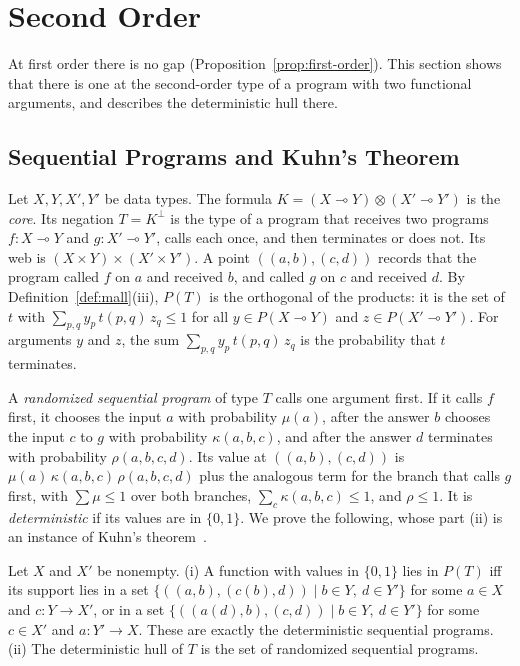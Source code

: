 \section{Second Order}
\label{sec:second}

At first order there is no gap (Proposition~\ref{prop:first-order}). This
section shows that there is one at the second-order type of a program with
two functional arguments, and describes the deterministic hull there.

\subsection{Sequential Programs and Kuhn's Theorem}
\label{sec:second-seq}

Let $X, Y, X', Y'$ be data types. The formula
$K = (X \multimap Y) \otimes (X' \multimap Y')$ is the \emph{core}. Its negation $T = K^{\perp}$ is the type of a program that receives two programs
$f : X \multimap Y$ and $g : X' \multimap Y'$, calls each once, and then
terminates or does not. Its web is $(X \times Y) \times (X' \times Y')$. A point $((a, b), (c, d))$ records that the program called $f$ on
$a$ and received $b$, and called $g$ on $c$ and received $d$. By
Definition~\ref{def:mall}(iii), $P(T)$ is the orthogonal of the products: it
is the set of $t$ with $\sum_{p, q} y_p\, t(p, q)\, z_q \le 1$ for all
$y \in P(X \multimap Y)$ and $z \in P(X' \multimap Y')$. For
arguments $y$ and $z$, the sum $\sum_{p,q} y_p\, t(p,q)\, z_q$ is the
probability that $t$ terminates.

A \emph{randomized sequential program} of type $T$ calls one argument
first. If it calls $f$ first, it chooses the input $a$ with probability
$\mu(a)$, after the answer $b$ chooses the input $c$ to $g$ with
probability $\kappa(a, b, c)$, and after the answer $d$ terminates with
probability $\rho(a, b, c, d)$. Its value at $((a, b), (c, d))$ is
$\mu(a)\, \kappa(a, b, c)\, \rho(a, b, c, d)$ plus the analogous term for
the branch that calls $g$ first, with $\sum \mu \le 1$ over both branches,
$\sum_c \kappa(a, b, c) \le 1$, and $\rho \le 1$. It is
\emph{deterministic} if its values are in $\{0,1\}$. We prove the
following, whose part (ii) is an instance of Kuhn's
theorem~\cite{kuhn1953}.

\begin{theorem}
\label{thm:second-order}
Let $X$ and $X'$ be nonempty.
(i) A function with values in $\{0,1\}$ lies in $P(T)$ iff its support
lies in a set $\{((a, b), (c(b), d)) \mid b \in Y,\ d \in Y'\}$ for some
$a \in X$ and $c : Y \to X'$, or in a set
$\{((a(d), b), (c, d)) \mid b \in Y,\ d \in Y'\}$ for some $c \in X'$ and
$a : Y' \to X$. These are exactly the deterministic sequential programs.
(ii) The deterministic hull of $T$ is the set of randomized sequential programs.
\end{theorem}

